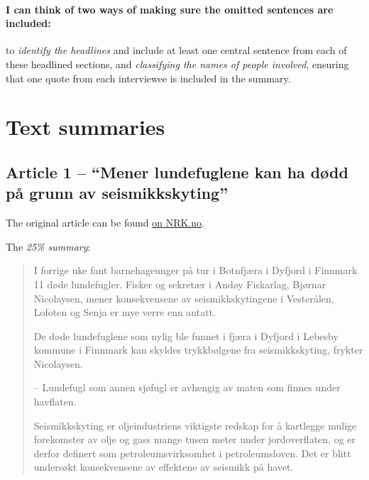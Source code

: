 \documentclass[11pt,a4paper]{article}
\renewcommand{\thesubsection}{\Alph{subsection}}
\begin{document}
      \paragraph{I can think of two ways of making sure the omitted sentences are included:}
      to \emph{identify the headlines} and include at least one central sentence from each of these headlined sections,
      and \emph{classifying the names of people involved}, ensuring that one quote from each interviewee is included in the summary.



\appendix

\renewcommand{\thesubsection}{\thesection-\arabic{subsection}}

\section{Text summaries} %
\label{sec:text_summaries}

  \subsection{Article 1 -- ``Mener lundefuglene kan ha dødd på grunn av seismikkskyting''} %
  \label{sub:article_1}

    The original article can be found \href{http://www.nrk.no/nyheter/distrikt/troms_og_finnmark/1.10996526}{on NRK.no}.

    The \emph{25\% summary}:

    \begin{quotation}
      I forrige uke fant barnehageunger på tur i Botnfjæra i Dyfjord i Finnmark 11 døde lundefugler.
      Fisker og sekretær i Andøy Fiskarlag, Bjørnar Nicolaysen, mener konsekvensene av seismikkskytingene i Vesterålen, Lofoten og Senja er mye verre enn antatt.

      De døde lundefuglene som nylig ble funnet i fjæra i Dyfjord i Lebesby kommune i Finnmark kan skyldes trykkbølgene fra seismikkskyting, frykter Nicolaysen.

      – Lundefugl som annen sjøfugl er avhengig av maten som finnes under havflaten.

      Seismikkskyting er oljeindustriens viktigste redskap for å kartlegge mulige forekomster av olje og gass mange tusen meter under jordoverflaten, og er derfor definert som petroleumsvirksomhet i petroleumsloven. Det er blitt undersøkt konsekvensene av effektene av seismikk på havet.
    \end{quotation}
\end{document}
